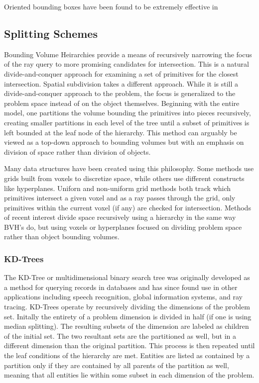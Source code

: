 \documentclass[10pt, a4paper]{article}
\begin{document}
Oriented bounding boxes have been found to be extremely effective in 


\subsection{Splitting Schemes}%

Bounding Volume Heirarchies provide a means of recursively narrowing the focus of the ray query to more promising candidates for intersection. This is a natural divide-and-conquer approach for examining a set of primitives for the closest intersection. Spatial subdivision takes a different approach. \cite{Intro2RT} While it is still a divide-and-conquer approach to the problem, the focus is generalized to the problem space instead of on the object themselves. Beginning with the entire model, one partitions the volume bounding the primitives into pieces recursively, creating smaller partitions in each level of the tree until a subset of primitives is left bounded at the leaf node of the hierarchy. This method can arguably be viewed as a top-down approach to bounding volumes but with an emphasis on division of space rather than division of objects.


Many data structures have been created using this philosophy. Some methods use grids built from voxels to discretize space, while others use different constructs like hyperplanes. Uniforn and non-uniform grid methods both track which primitives intersect a given voxel and as a ray passes through the grid, only primitives within the current voxel (if any) are checked for intersection. Methods of recent interest divide space recursively using a hierarchy in the same way BVH's do, but using voxels or hyperplanes focused on dividing problem space rather than object bounding volumes.


\subsubsection{KD-Trees}%

The KD-Tree or multidimensional binary search tree was originally developed as a method for querying records in databases and has since found use in other applications including speech recognition, global information systems, and ray tracing. \cite{Bentley1975} KD-Trees operate by recursively dividing the dimensions of the problem set. Initally the entirety of a problem dimension is divided in half (if one is using median splitting). The resulting subsets of the dimension are labeled as children of the initial set. The two resultant sets are the partitioned as well, but in a different dimension than the original partition. This process is then repeated until the leaf conditions of the hierarchy are met. Entities are listed as contained by a partition only if they are contained by all parents of the partition as well, meaning that all entities lie within some subset in each dimension of the problem.
\end{document}
